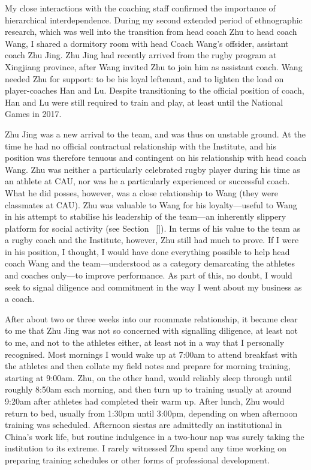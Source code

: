 \begin{CJK}{UTF8}{gbsn}
My close interactions with the coaching staff confirmed the importance of hierarchical interdependence. During my second extended period of ethnographic research, which was well into the transition from head coach Zhu to head coach Wang, I shared a dormitory room with head Coach Wang's offsider, assistant coach Zhu Jing.  Zhu Jing had recently arrived from the rugby program at Xingjiang province, after Wang invited Zhu to join him as assistant coach.   Wang needed Zhu for support: to be his loyal leftenant, and to lighten the load on player-coaches Han and Lu. Despite transitioning to the official position of coach, Han and Lu were still required to train and play, at least until the National Games in 2017.

Zhu Jing was a new arrival to the team, and was thus on unstable ground. At the time he had no official contractual relationship with the Institute, and his position was therefore tenuous and contingent on his relationship with head coach Wang.  Zhu was neither a particularly celebrated rugby player during his time as an athlete at CAU, nor was he a particularly experienced or successful coach.  What he did posses, however, was a close relationship to Wang (they were classmates at CAU). Zhu was valuable to Wang for his loyalty---useful to Wang in his attempt to stabilise his leadership of the team---an inherently slippery platform for social activity (see Section ~\ref{}). In terms of his value to the team as a rugby coach and the Institute, however, Zhu still had much to prove.  If I were in his position, I thought, I would have done everything possible to help head coach Wang and the team—understood as  a category demarcating the athletes and coaches only---to improve performance.  As part of this, no doubt, I would seek to signal diligence and commitment in the way I went about my business as a coach.

After about two or three weeks into our roommate relationship, it became clear to me that Zhu Jing was not so concerned with signalling diligence, at least not to me, and not to the athletes either, at least not in a way that I personally recognised.  Most mornings I would wake up at 7:00am to attend breakfast with the athletes and then collate my field notes and prepare for morning training, starting at 9:00am.  Zhu, on the other hand, would reliably sleep through until roughly 8:50am each morning, and then turn up to training usually at around 9:20am after athletes had completed their warm up.  After lunch, Zhu would return to bed, usually from 1:30pm until 3:00pm, depending on when afternoon training was scheduled.  Afternoon siestas are admittedly an institutional in China's work life, but routine indulgence in a two-hour nap was surely taking the institution to its extreme.  I rarely witnessed Zhu spend any time working on preparing training schedules or other forms of professional development.


\end{CJK}
